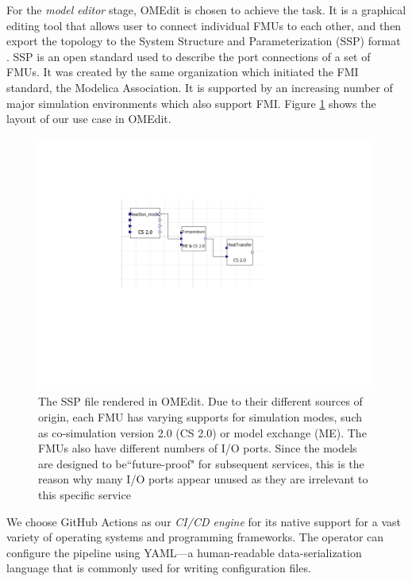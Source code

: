 For the \textit{model editor} stage, OMEdit \cite{OMEdit} is chosen to achieve the task. It is a graphical editing tool that allows user to connect individual FMUs to each other, and then export the topology to the System Structure and Parameterization (SSP) format \cite{SSP}. SSP is an open standard used to describe the port connections of a set of FMUs. It was created by the same organization which initiated the FMI standard, the Modelica Association. It is supported by an increasing number of major simulation environments which also support FMI. Figure \ref{fig:s1_twop_omedit} shows the layout of our use case in OMEdit.

\begin{figure}[hbt!]
  \centering
  \includegraphics[scale=0.6]{figures/s1_twop_omedit.pdf}
  \caption[The SSP file rendered in OMEdit]{The SSP file rendered in OMEdit. Due to their different sources of origin, each FMU has varying supports for simulation modes, such as co-simulation version 2.0 (CS 2.0) or model exchange (ME). The FMUs also have different numbers of I/O ports. Since the models are designed to be``future-proof" for subsequent services, this is the reason why many I/O ports appear unused as they are irrelevant to this specific service}
  \label{fig:s1_twop_omedit}
\end{figure}

We choose GitHub Actions \cite{GitHubActions} as our \textit{CI/CD engine} for its native support for a vast variety of operating systems and programming frameworks. The operator can configure the pipeline using YAML---a human-readable data-serialization language that is commonly used for writing configuration files. 

